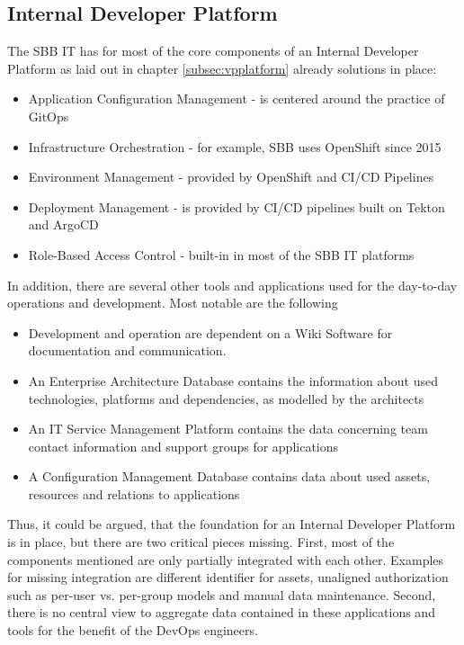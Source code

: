 \documentclass[a4paper,12pt]{article}
\begin{document}
    \subsection{Internal Developer Platform}
    \label{subsec:sbbplatform}
    The SBB IT has for most of the core components of an Internal Developer Platform as laid out in chapter \ref{subsec:vpplatform}
    already solutions in place:
    \begin{itemize}
        \item Application Configuration Management - is centered around the practice of GitOps\parencite{hashicorpvault}
        \item Infrastructure Orchestration - for example, SBB uses OpenShift since 2015\parencite{rhsbbopenshift}
        \item Environment Management - provided by OpenShift and CI/CD Pipelines
        \item Deployment Management - is provided by CI/CD pipelines built on Tekton and ArgoCD\parencite{sbbtekton}
        \item Role-Based Access Control - built-in in most of the SBB IT platforms
    \end{itemize}
    In addition, there are several other tools and applications used for the day-to-day operations and development.
    Most notable are the following
    \begin{itemize}
        \item Development and operation are dependent on a Wiki Software for documentation and communication.
        \item An Enterprise Architecture Database contains the information about used technologies, platforms and
        dependencies, as modelled by the architects
        \item An IT Service Management Platform contains the data concerning team contact information and support groups for applications
        \item A Configuration Management Database contains data about used assets, resources and relations to applications
    \end{itemize}
    Thus, it could be argued, that the foundation for an Internal Developer Platform is in place, but there are two
    critical pieces missing.
    First, most of the components mentioned are only partially integrated with each other.
    Examples for missing integration are different identifier for assets, unaligned authorization such as per-user vs.
    per-group models and manual data maintenance.
    Second, there is no central view to aggregate data contained in these applications and tools for the benefit of
    the DevOps engineers.
\end{document}
